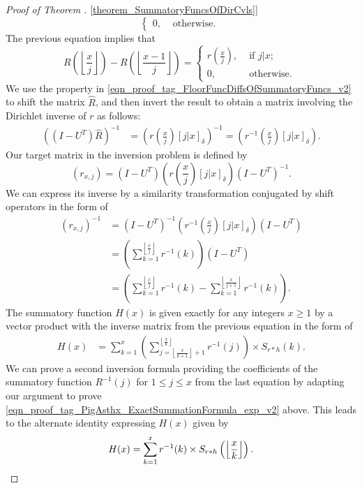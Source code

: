 \documentclass[11pt,reqno,a4letter]{article}
\newcommand{\hlocalref}[1]{\hyperref[#1]{\ref{#1}}}
\numberwithin{equation}{section}
\numberwithin{figure}{section}
\numberwithin{table}{section}
\newcommand{\Iverson}[1]{\ensuremath{\left[#1\right]_{\delta}}}
\newcommand{\floor}[1]{\left\lfloor #1 \right\rfloor}
\newcommand{\Floor}[2]{\ensuremath{\left\lfloor \frac{#1}{#2} \right\rfloor}}
\theoremstyle{plain}
\numberwithin{theorem}{section}
\theoremstyle{definition}
\begin{document}
\begin{proof}[Proof of Theorem \hlocalref{theorem_SummatoryFuncsOfDirCvls}]
\[\begin{cases}
     0, & \text{ otherwise. } 
     \end{cases} 
\] 
The previous equation implies that 
\begin{equation} 
\label{eqn_proof_tag_FloorFuncDiffsOfSummatoryFuncs_v2} 
R\left(\floor{\frac{x}{j}}\right) - R\left(\floor{\frac{x-1}{j}}\right) = 
     \begin{cases} 
     r\left(\frac{x}{j}\right), & \text{ if $j | x$; } \\ 
     0, & \text{ otherwise. } 
     \end{cases}
\end{equation} 
We use the property in \eqref{eqn_proof_tag_FloorFuncDiffsOfSummatoryFuncs_v2} 
to shift the matrix $\hat{R}$, and then invert the result to obtain a matrix involving the 
Dirichlet inverse of $r$ as follows: 
\begin{align*} 
\left(\left(I-U^{T}\right) \hat{R}\right)^{-1} & = 
     \left(r\left(\frac{x}{j}\right) \Iverson{j|x}\right)^{-1} = 
     \left(r^{-1}\left(\frac{x}{j}\right) \Iverson{j|x}\right). 
\end{align*} 
Our target matrix in the inversion problem is defined by 
$$(r_{x,j}) = \left(I-U^{T}\right) \left(r\left(\frac{x}{j}\right) \Iverson{j|x}\right) \left(I-U^{T}\right)^{-1}.$$
We can express its inverse by a similarity transformation conjugated by shift operators in the form of 
\begin{align*} 
(r_{x,j})^{-1} & = \left(I-U^{T}\right)^{-1} \left(r^{-1}\left(\frac{x}{j}\right) 
     \Iverson{j|x}\right) \left(I-U^{T}\right) \\ 
     & = \left(\sum_{k=1}^{\floor{\frac{x}{j}}} r^{-1}(k)\right) \left(I-U^{T}\right) \\ 
     & = \left(\sum_{k=1}^{\floor{\frac{x}{j}}} r^{-1}(k) - \sum_{k=1}^{\floor{\frac{x}{j+1}}} r^{-1}(k)\right). 
\end{align*} 
The summatory function $H(x)$ is given exactly for any integers $x \geq 1$ 
by a vector product with the inverse matrix from the previous equation in the form of 
\begin{align*} 
H(x) & = \sum_{k=1}^x \left(\sum_{j=\floor{\frac{x}{k+1}}+1}^{\floor{\frac{x}{k}}} r^{-1}(j)\right) 
     \times S_{r \ast h}(k). 
\end{align*} 
We can prove a second inversion formula providing the coefficients of the summatory function 
$R^{-1}(j)$ for $1 \leq j \leq x$ from the last equation by adapting our argument to prove 
\eqref{eqn_proof_tag_PigAsthx_ExactSummationFormula_exp_v2} above. 
This leads to the alternate identity expressing $H(x)$ given by 
\[
H(x) = \sum_{k=1}^{x} r^{-1}(k) \times S_{r \ast h}\left(\Floor{x}{k}\right). 
     \qedhere 
\]
\end{proof} 
\end{document}
